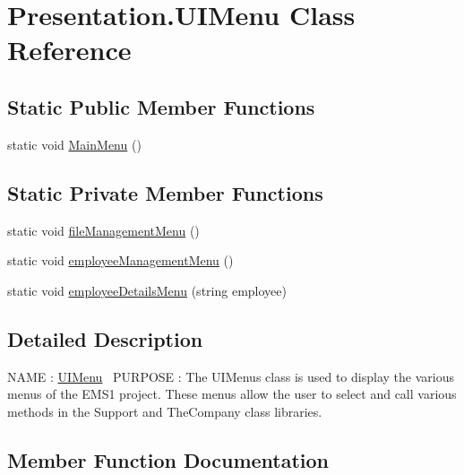 \hypertarget{class_presentation_1_1_u_i_menu}{}\section{Presentation.\+U\+I\+Menu Class Reference}
\label{class_presentation_1_1_u_i_menu}
\subsection*{Static Public Member Functions}
\begin{DoxyCompactItemize}
\item 
static void \hyperlink{class_presentation_1_1_u_i_menu_a43edeee39bcc1edf4b5f5baefb1caa46}{Main\+Menu} ()
\end{DoxyCompactItemize}
\subsection*{Static Private Member Functions}
\begin{DoxyCompactItemize}
\item 
static void \hyperlink{class_presentation_1_1_u_i_menu_ae30943530e6d38661fb65dfc2c32d1d0}{file\+Management\+Menu} ()
\item 
static void \hyperlink{class_presentation_1_1_u_i_menu_a0e4ef25a691022cfe286e503ed72f5b7}{employee\+Management\+Menu} ()
\item 
static void \hyperlink{class_presentation_1_1_u_i_menu_a185634fad8373f310ab192b5c91b517b}{employee\+Details\+Menu} (string employee)
\end{DoxyCompactItemize}


\subsection{Detailed Description}
N\+A\+M\+E \+: \hyperlink{class_presentation_1_1_u_i_menu}{U\+I\+Menu}~\newline
 P\+U\+R\+P\+O\+S\+E \+: The U\+I\+Menus class is used to display the various menus of the E\+M\+S1 project. These menus allow the user to select and call various methods in the Support and The\+Company class libraries. 

\subsection{Member Function Documentation}
\hypertarget{class_presentation_1_1_u_i_menu_a185634fad8373f310ab192b5c91b517b}{}
